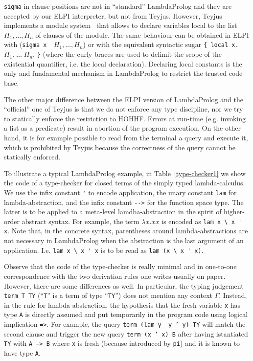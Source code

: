 \documentclass[preprint]{sigplanconf}
\begin{document}
\texttt{sigma} in clause positions are not in ``standard'' LambdaProlog and they are accepted by our ELPI interpreter, but not from Teyjus. However, Teyjus implements a module system~\cite{???} that allows to declare variables local to the list $H_1,\ldots, H_n$ of clauses of the module. The same behaviour can be obtained in ELPI with (\texttt{sigma x \ }$H_1, \ldots, H_n$) or with the equivalent
syntactic sugar \texttt{\{ local x.} $H_1.\;\ldots\; H_n.$ \texttt{\}} (where the curly braces are used to delimit the scope of the existential quantifier, i.e. the local declaration). Declaring local constants is the only and fundamental mechanism in LambdaProlog to restrict the trusted code base.

The other major difference between the ELPI version of LambdaProlog and the ``official'' one of Teyjus is that we do not enforce any type discipline, nor we try to statically enforce the restriction to HOHHF. Errors at run-time (e.g. invoking a list as a predicate) result in abortion of the program execution. On the other hand, it is for example possible to read from the terminal a query and execute it, which is prohibited by Teyjus because the correctness of the query cannot be statically enforced.

To illustrate a typical LambdaProlog example, in Table~\ref{type-checker1} we show the code of a type-checker for closed terms of the simply typed lambda-calculus. We use the infix constant \verb+'+ to encode application, the unary constant \verb+lam+ for lambda-abstraction, and the infix constant \verb+-->+ for the function space type. The latter is to be applied to a meta-level lamdba-abstraction in the spirit of higher-order abstract syntax. For example, the term $\lambda x.xx$ is encoded as \verb+lam x \ x ' x+. Note that, in the concrete syntax, parentheses around lambda-abstractions are not necessary in LambdaProlog when the abstraction is the last argument of an application. I.e. \verb+lam x \ x ' x+ is to be read as \verb+lam (x \ x ' x)+.

Observe that the code of the type-checker is really minimal and in one-to-one correspondence with the two derivation rules one writes usually on paper. However, there are some differences as well. In particular, the typing judgement \texttt{term T TY} (``\texttt{T}'' is a term of type ``\texttt{TY}'') does not mention any context $\Gamma$. Instead, in the rule for lambda-abstraction, the hypothesis that the fresh variable \texttt{x} has type \texttt{A} is directly assumed and put temporarily in the program code using logical implication \texttt{=>}.
For example, the query \texttt{term (lam y \ y ' y) TY} will match the second
clause and trigger the new query \texttt{term (x ' x) B} after having istantiated \texttt{TY} with \texttt{A --> B} where \texttt{x} is fresh (because introduced by \texttt{pi}) and it is known to have type \texttt{A}.
\end{document}
